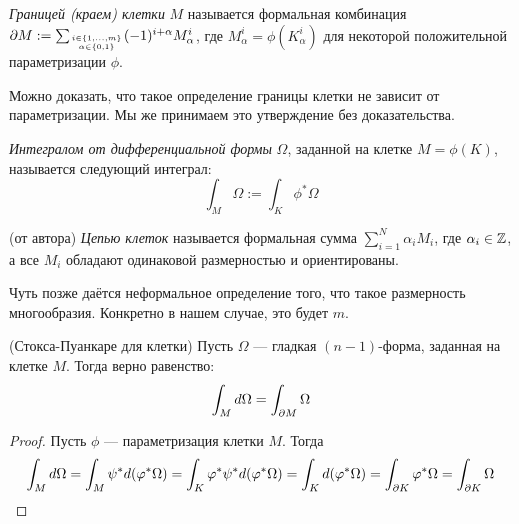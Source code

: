 \begin{definition}
	\textit{Границей (краем) клетки} $M$ называется формальная комбинация $\partial M := \sum_{i \in \{1, \ldots, m\} \atop {\alpha \in \{0, 1\}}} (-1)^{i + \alpha} M_\alpha^i$, где $M_\alpha^i = \phi(K_\alpha^i)$ для некоторой положительной параметризации $\phi$.
\end{definition}

\begin{note}
	Можно доказать, что такое определение границы клетки не зависит от параметризации. Мы же принимаем это утверждение без доказательства.
\end{note}

\begin{definition}
	\textit{Интегралом от дифференциальной формы} $\Omega$, заданной на клетке $M = \phi(K)$, называется следующий интеграл:
	\[
		\int_M \Omega := \int_K \phi^*\Omega
	\]
\end{definition}

\begin{definition} (от автора)
	\textit{Цепью клеток} называется формальная сумма $\sum_{i = 1}^N \alpha_i M_i$, где $\alpha_i \in \mathbb{Z}$, а все $M_i$ обладают одинаковой размерностью и ориентированы.
\end{definition}

\begin{anote}
	Чуть позже даётся неформальное определение того, что такое размерность многообразия. Конкретно в нашем случае, это будет $m$.
\end{anote}

\begin{theorem} (Стокса-Пуанкаре для клетки)
	Пусть $\Omega$ --- гладкая $(n - 1)$-форма, заданная на клетке $M$. Тогда верно равенство:
	\[
		\int_M d\Omega = \int_{\partial M} \Omega
	\]
\end{theorem}

\begin{proof}
	Пусть $\phi$ --- параметризация клетки $M$. Тогда
	\[
		\int_M d\Omega = \int_M \psi^* d(\varphi^*\Omega) = \int_K \varphi^* \psi^* d(\varphi^*\Omega) = \int_K d(\varphi^*\Omega) = \int_{\partial K} \varphi^*\Omega = \int_{\partial K} \Omega
	\]
\end{proof}